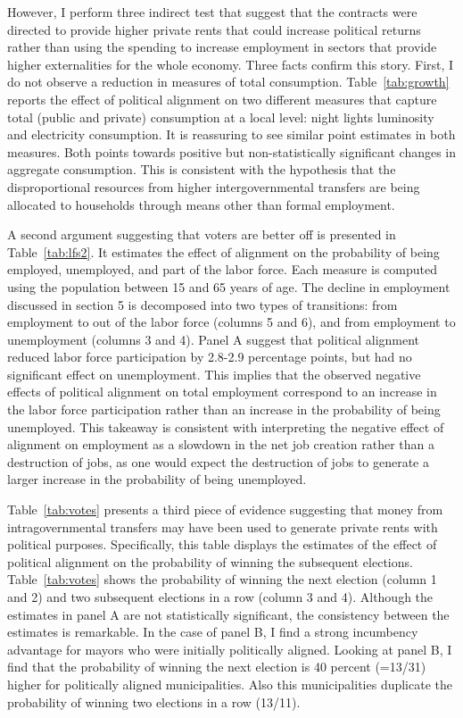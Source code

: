 \documentclass[dv_diss_main.tex]{subfiles}
\begin{document}
However, I perform three indirect test that suggest that the contracts were directed to provide higher private rents that could increase political returns rather than using the spending to increase employment in sectors that provide higher externalities for the whole economy. Three facts confirm this story. First,
I do not observe a reduction in measures of total consumption. Table~\ref{tab:growth} reports the effect of political alignment on two different measures that capture total (public and private) consumption at a local level: night lights luminosity and electricity consumption. It is reassuring to see similar point estimates in both measures. Both points towards positive but non-statistically significant changes in aggregate consumption. This is consistent with the hypothesis that the disproportional resources from higher intergovernmental transfers are being allocated to households through means other than formal employment. 

A second argument suggesting that voters are better off is presented in Table~\ref{tab:lfs2}. It estimates the effect of alignment on the probability of being employed, unemployed, and part of the labor force. Each measure is computed using the population between 15 and 65 years of age. The decline in employment discussed in section 5 is decomposed into two types of transitions: from employment to out of the labor force (columns 5 and 6), and from employment to unemployment (columns 3 and 4). Panel A suggest that political alignment reduced labor force participation by 2.8-2.9 percentage points, but had no significant effect on unemployment. This implies that the observed negative effects of political alignment on total employment correspond to an increase in the labor force participation rather than an increase in the probability of being unemployed. This takeaway is consistent with interpreting the negative effect of alignment on employment as a slowdown in the net job creation rather than a destruction of jobs, as one would expect the destruction of jobs to generate a larger increase in the probability of being unemployed. 

Table~\ref{tab:votes} presents a third piece of evidence suggesting that money from intragovernmental transfers may have been used to generate private rents with political purposes. Specifically, this table displays the estimates of the effect of political alignment on the probability of winning the subsequent elections. Table~\ref{tab:votes} shows the probability of winning the next election (column 1 and 2) and two subsequent elections in a row (column 3 and 4). Although the estimates in panel A are not statistically significant, the consistency between the estimates is remarkable. In the case of panel B, I find a strong incumbency advantage for mayors who were initially politically aligned. Looking at panel B, I find that the probability of winning the next election is 40 percent (=13/31) higher for politically aligned municipalities. Also this municipalities duplicate the probability of winning two elections in a row (13/11).
\end{document}
